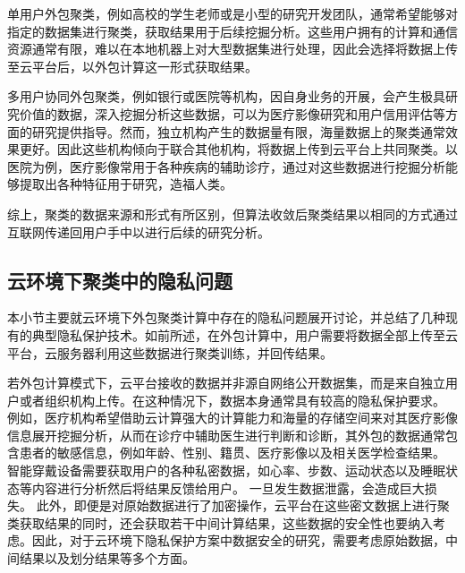单用户外包聚类，例如高校的学生老师或是小型的研究开发团队，通常希望能够对指定的数据集进行聚类，获取结果用于后续挖掘分析。这些用户拥有的计算和通信资源通常有限，难以在本地机器上对大型数据集进行处理，因此会选择将数据上传至云平台后，以外包计算这一形式获取结果。

多用户协同外包聚类，例如银行或医院等机构，因自身业务的开展，会产生极具研究价值的数据，深入挖掘分析这些数据，可以为医疗影像研究和用户信用评估等方面的研究提供指导。然而，独立机构产生的数据量有限，海量数据上的聚类通常效果更好。因此这些机构倾向于联合其他机构，将数据上传到云平台上共同聚类。以医院为例，医疗影像常用于各种疾病的辅助诊疗，通过对这些数据进行挖掘分析能够提取出各种特征用于研究，造福人类。

综上，聚类的数据来源和形式有所区别，但算法收敛后聚类结果以相同的方式通过互联网传递回用户手中以进行后续的研究分析。
%
%
%
\subsection{云环境下聚类中的隐私问题}
本小节主要就云环境下外包聚类计算中存在的隐私问题展开讨论，并总结了几种现有的典型隐私保护技术。如前所述，在外包计算中，用户需要将数据全部上传至云平台，云服务器利用这些数据进行聚类训练，并回传结果。

若外包计算模式下，云平台接收的数据并非源自网络公开数据集，而是来自独立用户或者组织机构上传。在这种情况下，数据本身通常具有较高的隐私保护要求。
例如，医疗机构希望借助云计算强大的计算能力和海量的存储空间来对其医疗影像信息展开挖掘分析，从而在诊疗中辅助医生进行判断和诊断，其外包的数据通常包含患者的敏感信息，例如年龄、性别、籍贯、医疗影像以及相关医学检查结果。
智能穿戴设备需要获取用户的各种私密数据，如心率、步数、运动状态以及睡眠状态等内容进行分析然后将结果反馈给用户。
一旦发生数据泄露，会造成巨大损失。
此外，即便是对原始数据进行了加密操作，云平台在这些密文数据上进行聚类获取结果的同时，还会获取若干中间计算结果，这些数据的安全性也要纳入考虑。因此，对于云环境下隐私保护方案中数据安全的研究，需要考虑原始数据，中间结果以及划分结果等多个方面。

